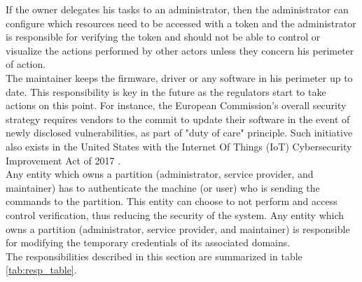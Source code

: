 \documentclass[conference]{IEEEtran}
\begin{document}
If the owner delegates his tasks to an administrator, then the administrator can configure which resources need to be accessed with a token and the administrator is responsible for verifying the token and should not be able to control or visualize the actions performed by other actors unless they concern his perimeter of action.\\

The maintainer keeps the firmware, driver or any software in his perimeter up to date. This responsibility is key in the future as the regulators start to take actions on this point. For instance, the European Commission's overall security strategy \cite{enisa_iot_2017} requires vendors to the commit to update their software in the event of newly disclosed vulnerabilities, as part of "duty of care" principle. Such initiative also exists in the United States with the Internet Of Things (IoT) Cybersecurity Improvement Act of 2017 \cite{IOTAct_2017}.\\

Any entity which owns a partition (administrator, service provider, and maintainer) has to authenticate the machine (or user) who is sending the commands to the partition. This entity can choose to not perform and access control verification, thus reducing the security of the system. Any entity which owns a partition (administrator, service provider, and maintainer) is responsible for modifying the temporary credentials of its associated domains.\\

The responsibilities described in this section are summarized in table \ref{tab:resp_table}.\\
\end{document}
